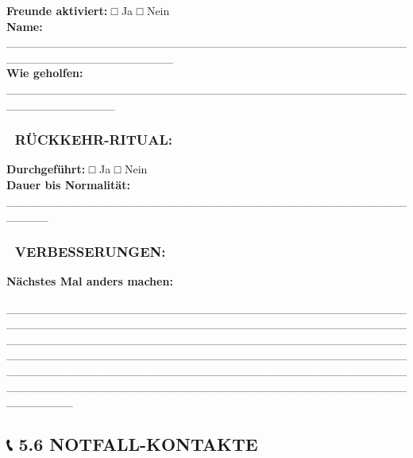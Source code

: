 \textbf{Freunde aktiviert:} □ Ja □ Nein\\
\textbf{Name:} \_\_\_\_\_\_\_\_\_\_\_\_\_\_\_\_\_\_\_\_\_\_\_\_\_\_\_\_\_\_\_\_\_\_\_\_\_\_\_\_\_\_\_\_\_\_\_\_\_\_\_\_\_\_\_\_\_\_\_\_\_\_\_\_\_\_\_\_\\
\textbf{Wie geholfen:} \_\_\_\_\_\_\_\_\_\_\_\_\_\_\_\_\_\_\_\_\_\_\_\_\_\_\_\_\_\_\_\_\_\_\_\_\_\_\_\_\_\_\_\_\_\_\_\_\_\_\_\_\_\_\_\_\_\_\_\_\_

\hypertarget{section-12}{%
\subsubsection{}\label{section-12}}

\hypertarget{ruxfcckkehr-ritual}{%
\subsubsection{\texorpdfstring{\textbf{🔄 RÜCKKEHR-RITUAL:}}{🔄 RÜCKKEHR-RITUAL:}}\label{ruxfcckkehr-ritual}}

\textbf{Durchgeführt:} □ Ja □ Nein\\
\textbf{Dauer bis Normalität:} \_\_\_\_\_\_\_\_\_\_\_\_\_\_\_\_\_\_\_\_\_\_\_\_\_\_\_\_\_\_\_\_\_\_\_\_\_\_\_\_\_\_\_\_\_\_\_\_\_\_\_\_\_

\hypertarget{verbesserungen}{%
\subsubsection{\texorpdfstring{\textbf{📝 VERBESSERUNGEN:}}{📝 VERBESSERUNGEN:}}\label{verbesserungen}}

\textbf{Nächstes Mal anders machen:}

\_\_\_\_\_\_\_\_\_\_\_\_\_\_\_\_\_\_\_\_\_\_\_\_\_\_\_\_\_\_\_\_\_\_\_\_\_\_\_\_\_\_\_\_\_\_\_\_\_\_\_\_\_\_\_\_\_\_\_\_\_\_\_\_\_\_\_\_\_\_\_\_\_\_\_\_\_\_\_\_\_\_\_\_\_\_\_\_\_\_\_\_\_\_\_\_\_\_\_\_\_\_\_\_\_\_\_\_\_\_\_\_\_\_\_\_\_\_\_\_\_\_\_\_\_\_\_\_\_\_\_\_\_\_\_\_\_\_\_\_\_\_\_\_\_\_\_\_\_\_\_\_\_\_\_\_\_\_\_\_\_\_\_\_\_\_\_\_\_\_\_\_\_\_\_\_\_\_\_\_\_\_\_\_\_\_\_\_\_\_\_\_\_\_\_\_\_\_\_\_\_\_\_\_\_\_\_\_\_\_\_\_\_\_\_\_\_\_\_\_\_\_\_\_\_\_\_\_\_\_\_\_\_\_\_\_\_\_\_\_\_\_\_\_\_\_\_\_\_\_\_\_\_\_\_\_\_\_\_\_\_\_\_\_\_\_\_\_\_\_\_\_\_\_\_\_\_\_\_\_\_\_\_\_\_\_\_\_\_\_\_\_\_\_\_\_

\hypertarget{notfall-kontakte}{%
\subsection{\texorpdfstring{📞 \textbf{5.6 NOTFALL-KONTAKTE}}{📞 5.6 NOTFALL-KONTAKTE}}\label{notfall-kontakte}}

